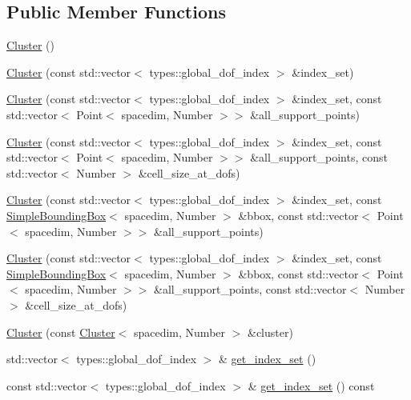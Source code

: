 \subsection*{Public Member Functions}
\textbf{ }\par
\begin{DoxyCompactItemize}
\item 
\hyperlink{classCluster_a214163f431f0bd9840d14bbebcc087e7}{Cluster} ()
\item 
\hyperlink{classCluster_aa87c73e27c410b04415e5ff1b026ae74}{Cluster} (const std\+::vector$<$ types\+::global\+\_\+dof\+\_\+index $>$ \&index\+\_\+set)
\item 
\hyperlink{classCluster_a157b06089b0f866a754a8e3a3aa49fd9}{Cluster} (const std\+::vector$<$ types\+::global\+\_\+dof\+\_\+index $>$ \&index\+\_\+set, const std\+::vector$<$ Point$<$ spacedim, Number $>$$>$ \&all\+\_\+support\+\_\+points)
\item 
\hyperlink{classCluster_a07a5837c2f6c0b676ca45b826e51b460}{Cluster} (const std\+::vector$<$ types\+::global\+\_\+dof\+\_\+index $>$ \&index\+\_\+set, const std\+::vector$<$ Point$<$ spacedim, Number $>$$>$ \&all\+\_\+support\+\_\+points, const std\+::vector$<$ Number $>$ \&cell\+\_\+size\+\_\+at\+\_\+dofs)
\item 
\hyperlink{classCluster_aaa9ac4c5b6df1633980e45c3076e17e0}{Cluster} (const std\+::vector$<$ types\+::global\+\_\+dof\+\_\+index $>$ \&index\+\_\+set, const \hyperlink{classSimpleBoundingBox}{Simple\+Bounding\+Box}$<$ spacedim, Number $>$ \&bbox, const std\+::vector$<$ Point$<$ spacedim, Number $>$$>$ \&all\+\_\+support\+\_\+points)
\item 
\hyperlink{classCluster_adf806cf8bccb891707d8e7d4c345518b}{Cluster} (const std\+::vector$<$ types\+::global\+\_\+dof\+\_\+index $>$ \&index\+\_\+set, const \hyperlink{classSimpleBoundingBox}{Simple\+Bounding\+Box}$<$ spacedim, Number $>$ \&bbox, const std\+::vector$<$ Point$<$ spacedim, Number $>$$>$ \&all\+\_\+support\+\_\+points, const std\+::vector$<$ Number $>$ \&cell\+\_\+size\+\_\+at\+\_\+dofs)
\item 
\hyperlink{classCluster_a27a372b05916f136ff9fe3e5a92a4362}{Cluster} (const \hyperlink{classCluster}{Cluster}$<$ spacedim, Number $>$ \&cluster)
\item 
std\+::vector$<$ types\+::global\+\_\+dof\+\_\+index $>$ \& \hyperlink{classCluster_ada8786f2258b9fbeed2ed04bc1007c89}{get\+\_\+index\+\_\+set} ()
\item 
const std\+::vector$<$ types\+::global\+\_\+dof\+\_\+index $>$ \& \hyperlink{classCluster_acd4c3a1c712aca32cffefb64f88a1b08}{get\+\_\+index\+\_\+set} () const

\end{DoxyCompactItemize}
